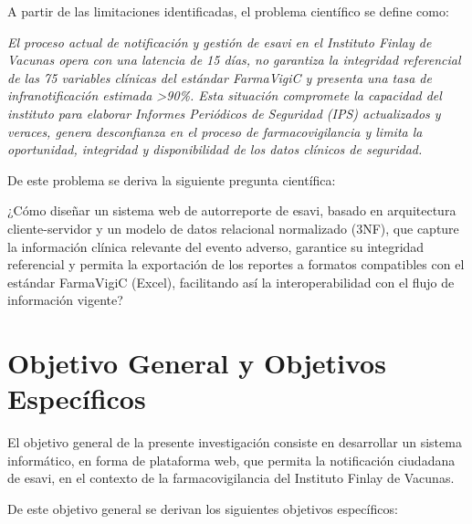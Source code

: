 A partir de las limitaciones identificadas, el problema científico se define como:

\textit{El proceso actual de notificación y gestión de \gls{esavi} en el Instituto Finlay de Vacunas opera con una latencia de 15 días, no garantiza la integridad referencial de las 75 variables clínicas del estándar \gls{FarmaVigiC} y presenta una tasa de infranotificación estimada >90\%. Esta situación compromete la capacidad del instituto para elaborar Informes Periódicos de Seguridad (IPS) actualizados y veraces, genera desconfianza en el proceso de farmacovigilancia y limita la oportunidad, integridad y disponibilidad de los datos clínicos de seguridad.}


De este problema se deriva la siguiente pregunta científica:

¿Cómo diseñar un sistema web de autorreporte de \gls{esavi}, basado en arquitectura cliente-servidor y un modelo de datos relacional normalizado (3NF), que capture la información clínica relevante del evento adverso, garantice su integridad referencial y permita la exportación de los reportes a formatos compatibles con el estándar \gls{FarmaVigiC} (Excel), facilitando así la interoperabilidad con el flujo de información vigente?



\section{Objetivo General y Objetivos Específicos}\label{section:objetivosPrincipalesEspecificos}

El objetivo general de la presente investigación consiste en desarrollar un sistema informático, en forma de plataforma web, que permita la notificación ciudadana de \gls{esavi}, en el contexto de la farmacovigilancia del Instituto Finlay de Vacunas.

De este objetivo general se derivan los siguientes objetivos específicos:

